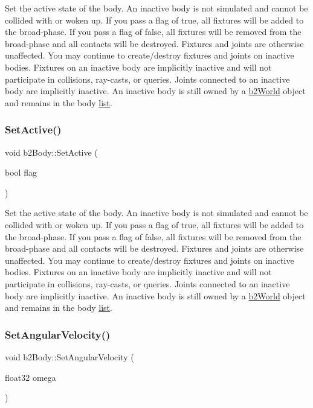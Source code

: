 Set the active state of the body. An inactive body is not simulated and cannot be collided with or woken up. If you pass a flag of true, all fixtures will be added to the broad-\/phase. If you pass a flag of false, all fixtures will be removed from the broad-\/phase and all contacts will be destroyed. Fixtures and joints are otherwise unaffected. You may continue to create/destroy fixtures and joints on inactive bodies. Fixtures on an inactive body are implicitly inactive and will not participate in collisions, ray-\/casts, or queries. Joints connected to an inactive body are implicitly inactive. An inactive body is still owned by a \hyperlink{classb2World}{b2\+World} object and remains in the body \hyperlink{protocollist-p}{list}. \mbox{\label{classb2Body_ab8059b7b3e3b64aee17b54f68f7dde80}} 
\subsubsection{\texorpdfstring{Set\+Active()}{SetActive()}\hspace{0.1cm}{\footnotesize\ttfamily [2/2]}}
{\footnotesize\ttfamily void b2\+Body\+::\+Set\+Active (\begin{DoxyParamCaption}\item[{bool}]{flag }\end{DoxyParamCaption})}

Set the active state of the body. An inactive body is not simulated and cannot be collided with or woken up. If you pass a flag of true, all fixtures will be added to the broad-\/phase. If you pass a flag of false, all fixtures will be removed from the broad-\/phase and all contacts will be destroyed. Fixtures and joints are otherwise unaffected. You may continue to create/destroy fixtures and joints on inactive bodies. Fixtures on an inactive body are implicitly inactive and will not participate in collisions, ray-\/casts, or queries. Joints connected to an inactive body are implicitly inactive. An inactive body is still owned by a \hyperlink{classb2World}{b2\+World} object and remains in the body \hyperlink{protocollist-p}{list}. \mbox{\label{classb2Body_a37adc4160b84f73e8552a91cbde3f578}} 
\subsubsection{\texorpdfstring{Set\+Angular\+Velocity()}{SetAngularVelocity()}\hspace{0.1cm}{\footnotesize\ttfamily [1/2]}}
{\footnotesize\ttfamily void b2\+Body\+::\+Set\+Angular\+Velocity (\begin{DoxyParamCaption}\item[{float32}]{omega }\end{DoxyParamCaption})\hspace{0.3cm}{\ttfamily [inline]}}


